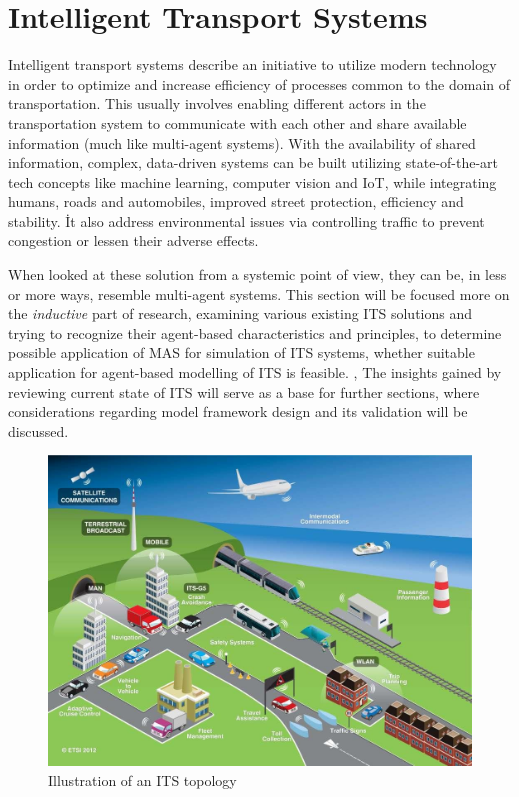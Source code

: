 \documentclass[main.tex]{subfiles}
\begin{document}
\section{Intelligent Transport Systems}\label{its}

Intelligent transport systems describe an initiative to utilize modern technology 
in order to optimize and increase efficiency of processes common to the domain of transportation. 
This usually involves enabling different actors in the transportation system to communicate 
with each other and share available information (much like multi-agent systems). With the 
availability of shared information, complex, data-driven systems can be built utilizing 
state-of-the-art tech concepts like machine learning, computer vision and IoT, while
integrating humans, roads and automobiles, improved street protection, efficiency and stability.
İt also address environmental issues via controlling traffic to prevent congestion or lessen
their adverse effects. 

When looked at these solution from a systemic point of view, they can 
be, in less or more ways, resemble multi-agent systems. This section will be focused more on 
the \emph{inductive} part of research, examining various existing ITS solutions and trying 
to recognize their agent-based characteristics and principles, to determine possible application 
of MAS for simulation of ITS systems, whether suitable application for agent-based modelling of 
ITS is feasible. , The insights gained by reviewing current state of ITS will 
serve as a base for further sections, where considerations regarding model framework design and 
its validation will be discussed. 



\begin{figure}[htbp]
    \centering
    \includegraphics[width=.8\textwidth]{ITS-schema.jpg}
    \caption{Illustration of an ITS topology \cite{ETSI}}
    \label{its-map}
\end{figure}
\end{document}
